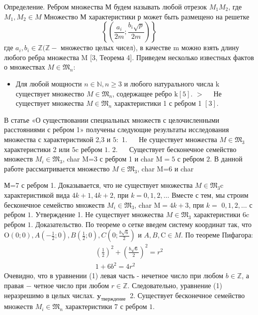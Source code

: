 \documentclass[a4paper,openbib]{article}
\renewcommand{\geq}{\geqslant}
\begin{document}
Определение. Ребром множества М будем называть любой отрезок $M_{1} M_{2}$, где $M_{1}, M_{2} \in M$
Множество М характеристики р может быть размещено на решетке
$$
\left\{\left(\frac{a_{i}}{2 m} ; \frac{b_{i} \sqrt{p}}{2 m}\right)\right\}
$$
где $a_{i}, b_{i} \in \mathbb{Z}(\mathbb{Z}-$ множество целых чисел), в качестве $\mathrm{m}$ можно взять длину любого ребра множества $\mathrm{M}$ [3, Теорема 4].
Приведем несколько известных фактов о множествах $M \in \mathfrak{M}_{n}:$
\begin{itemize}
- Для любого $n \in \mathbb{N}, n \geq 3$ выполнено $\mathfrak{M}_{n} \neq \emptyset$ [3, Теорема 2].
$>\quad \mathrm{C}$ возрастанием мощности диаметр возрастает не менее чем линейно [4,6].
- Для любой мощности $n \in \mathbb{N}, n \geq 3$ и любого свободного от квадратов числа р существует множество $M \in \mathfrak{M}_{n}$ такое, что char $\mathrm{M}=\mathrm{p}[3,$, Teopema 5 ].

\item Для любой мощности $n \in \mathbb{N}, n \geq 3$ и любого натурального числа $\mathrm{k}$ существует множество $M \in \mathfrak{M}_{n}$, содержащее ребро $\mathrm{k}[5] .$
$>\quad$ Не существует множества $M \in \mathfrak{M}_{n}$ характеристики 1 с ребром 1
$[3] .$
\end{itemize}
В статье «О существовании специальных множеств с целочисленными расстояниями с ребром 1» получены следующие результаты исследования множества с характеристикой 2,3 и $5:$
1. $\quad$ Не существует множества $M \in \mathfrak{M}_{3}$ характеристики 2 или $5 \mathrm{c}$ ребром $1 .$
2. $\quad$ Существует бесконечное семейство множеств $M_{i} \in \mathfrak{M}_{3}$, char M=3
с ребром 1 и char $\mathrm{M}=5$ с ребром $2 .$ В данной работе рассматривается множество $M \in \mathfrak{M}_{3}$, char M=6 и char

М=7 с ребром 1. Доказывается, что не существует множества $M \in \mathfrak{M}_{3} \mathrm{c}$ характеристикой вида $4 k+1,4 k+2$, при $k=0,1,2, \ldots$ Вместе с тем, мы строим бесконечное семейство множеств $M_{i} \in \mathfrak{M}_{3}$, char $\mathrm{M}=4 k+3$, при $k=$ $0,1,2, \ldots$ с ребром $1 .$
Утверждение 1. Не существует множества $M \in \mathfrak{M}_{3}$ характеристики $6 \mathrm{c}$ ребром $1 .$ Доказательство. По теореме о сетке введем систему координат так, что $\mathrm{O}(0 ; 0), A\left(-\frac{1}{2} ; 0\right), B\left(\frac{1}{2} ; 0\right), C\left(0 ; \frac{b \sqrt{6}}{2}\right)$ и $A, B, \mathrm{C} \in M .$ По теореме
Пифагора:
$$
\begin{array}{c}
\left(\frac{1}{2}\right)^{2}+\left(\frac{b \sqrt{6}}{2}\right)^{2}=r^{2} \\
1+6 b^{2}=4 r^{2}
\end{array}
$$
Очевидно, что в уравнении (1) левая часть - нечетное число при любом $b \in \mathbb{Z}$, а правая $-$ четное число при любом $r \in \mathbb{Z} .$ Следовательно, уравнение
(1) неразрешимо в целых числах. $\mathbf{y}_{\text {тверждение }}$ 2. Существует бесконечное семейство множеств $M_{i} \in \mathfrak{M}_{n}$ характеристики 7 с ребром $1 .$
\end{document}
